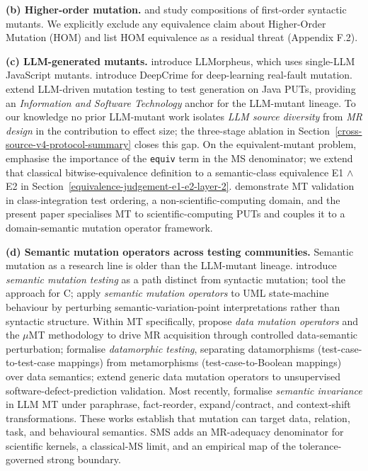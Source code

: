 \documentclass[review,12pt,authoryear]{elsarticle}
\begin{document}
\textbf{(b) Higher-order mutation.} \citet{c03829bdd1a6e45113092384bf0fa05a064ca54a} and \citet{kintis2018effective}
study compositions of first-order syntactic mutants. We
explicitly exclude any equivalence claim about Higher-Order Mutation
(HOM) and list HOM equivalence as a residual threat (Appendix F.2).

\textbf{(c) LLM-generated mutants.} \citet{tip2025llmorpheus}
introduce LLMorpheus, which uses single-LLM JavaScript mutants.
\citet{humbatova2021deepcrime} introduce DeepCrime for
deep-learning real-fault mutation. \citet{dakhel2024llm} extend
LLM-driven mutation testing to test generation on Java PUTs, providing
an \emph{Information and Software Technology} anchor for the LLM-mutant
lineage. To our knowledge no prior LLM-mutant work isolates \emph{LLM
source diversity} from \emph{MR design} in the contribution to effect
size; the three-stage ablation in Section~\ref{cross-source-v4-protocol-summary} closes this gap. On the
equivalent-mutant problem, \citet{delgadoperez2020equivalent} emphasise
the importance of the \texttt{equiv} term in the MS denominator; we
extend that classical bitwise-equivalence definition to a semantic-class
equivalence E1 $\wedge$ E2 in Section~\ref{equivalence-judgement-e1-e2-layer-2}. \citet{zhang2021classintegration} demonstrate MT
validation in class-integration test ordering, a
non-scientific-computing domain, and the present paper specialises MT to
scientific-computing PUTs and couples it to a domain-semantic mutation
operator framework.

\textbf{(d) Semantic mutation operators across testing communities.}
Semantic mutation as a research line is older than the LLM-mutant
lineage. \citet{7a6c280d9584691800e71876c716ea229335abeb} introduce \emph{semantic
mutation testing} as a path distinct from syntactic mutation; \citet{dan2012smtc}
tool the approach for C; \citet{derezinska2019uml}
apply \emph{semantic mutation operators} to UML state-machine behaviour
by perturbing semantic-variation-point interpretations rather than
syntactic structure. Within MT specifically, \citet{sun2016mumt,sun2024datamutation}
propose \emph{data mutation operators} and the $\mu$MT methodology to drive
MR acquisition through controlled data-semantic perturbation; \citet{zhu2020datamorphic}
formalise \emph{datamorphic testing}, separating
datamorphisms (test-case-to-test-case mappings) from metamorphisms
(test-case-to-Boolean mappings) over data semantics; \citet{chan2024metamorphic}
extend generic data mutation operators to unsupervised
software-defect-prediction validation. Most recently, \citet{0fa97cc4e2a0ffb6a777669b1b541c0372fac0d2}
formalise \emph{semantic invariance} in LLM MT under paraphrase,
fact-reorder, expand/contract, and context-shift transformations. These
works establish that mutation can target data, relation, task, and
behavioural semantics. SMS adds an MR-adequacy denominator for
scientific kernels, a classical-MS limit, and an empirical map of the
tolerance-governed strong boundary.
\end{document}
